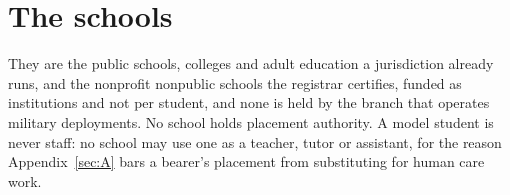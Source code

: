 \section{The schools}
\label{sec:28.11}
They are the public schools, colleges and adult education a jurisdiction already runs, and the nonprofit nonpublic schools the registrar certifies, funded as institutions and not per student, and none is held by the branch that operates military deployments. No school holds placement authority. A model student is never staff: no school may use one as a teacher, tutor or assistant, for the reason Appendix~\ref{sec:A} bars a bearer's placement from substituting for human care work.

